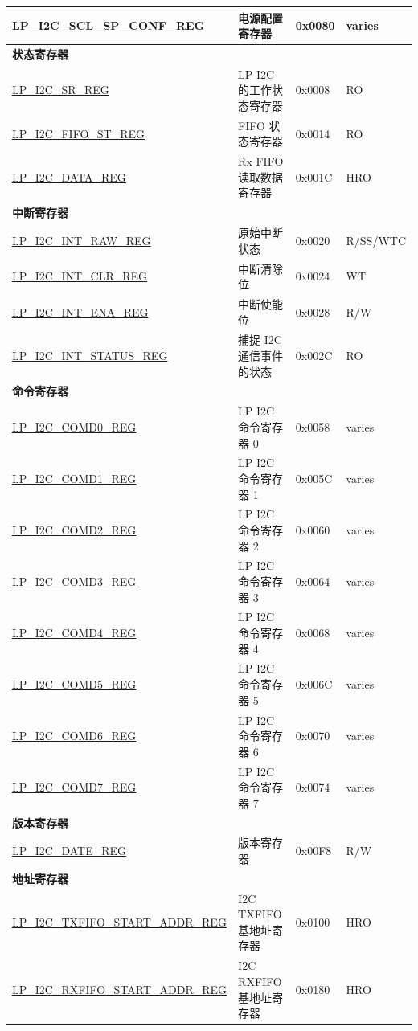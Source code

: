 \begin{longtable}{ | p{6.1cm} | p{7cm} | p{1.3cm} | p{1cm} | }
\hyperref[regdesc:LPI2CSCLSPCONFREG]{LP\_I2C\_SCL\_SP\_CONF\_REG} & 电源配置寄存器 & 0x0080 & varies \\ \hline
\multicolumn{4}{|l|}{\textbf{状态寄存器}} \\ \hline
\hyperref[regdesc:LPI2CSRREG]{LP\_I2C\_SR\_REG} & LP I2C 的工作状态寄存器 & 0x0008 & RO \\ \hline
\hyperref[regdesc:LPI2CFIFOSTREG]{LP\_I2C\_FIFO\_ST\_REG} & FIFO 状态寄存器 & 0x0014 & RO \\ \hline
\hyperref[regdesc:LPI2CDATAREG]{LP\_I2C\_DATA\_REG} & Rx FIFO 读取数据寄存器 & 0x001C & HRO \\ \hline
\multicolumn{4}{|l|}{\textbf{中断寄存器}} \\ \hline
\hyperref[regdesc:LPI2CINTRAWREG]{LP\_I2C\_INT\_RAW\_REG} & 原始中断状态 & 0x0020 & R/SS/WTC \\ \hline
\hyperref[regdesc:LPI2CINTCLRREG]{LP\_I2C\_INT\_CLR\_REG} & 中断清除位 & 0x0024 & WT \\ \hline
\hyperref[regdesc:LPI2CINTENAREG]{LP\_I2C\_INT\_ENA\_REG} & 中断使能位 & 0x0028 & R/W \\ \hline
\hyperref[regdesc:LPI2CINTSTATUSREG]{LP\_I2C\_INT\_STATUS\_REG} & 捕捉 I2C 通信事件的状态 & 0x002C & RO \\ \hline
\multicolumn{4}{|l|}{\textbf{命令寄存器}} \\ \hline
\hyperref[regdesc:LPI2CCOMD0REG]{LP\_I2C\_COMD0\_REG} & LP I2C 命令寄存器 0 & 0x0058 & varies \\ \hline
\hyperref[regdesc:LPI2CCOMD1REG]{LP\_I2C\_COMD1\_REG} & LP I2C 命令寄存器 1 & 0x005C & varies \\ \hline
\hyperref[regdesc:LPI2CCOMD2REG]{LP\_I2C\_COMD2\_REG} & LP I2C 命令寄存器 2 & 0x0060 & varies \\ \hline
\hyperref[regdesc:LPI2CCOMD3REG]{LP\_I2C\_COMD3\_REG} & LP I2C 命令寄存器 3 & 0x0064 & varies \\ \hline
\hyperref[regdesc:LPI2CCOMD4REG]{LP\_I2C\_COMD4\_REG} & LP I2C 命令寄存器 4 & 0x0068 & varies \\ \hline
\hyperref[regdesc:LPI2CCOMD5REG]{LP\_I2C\_COMD5\_REG} & LP I2C 命令寄存器 5 & 0x006C & varies \\ \hline
\hyperref[regdesc:LPI2CCOMD6REG]{LP\_I2C\_COMD6\_REG} & LP I2C 命令寄存器 6 & 0x0070 & varies \\ \hline
\hyperref[regdesc:LPI2CCOMD7REG]{LP\_I2C\_COMD7\_REG} & LP I2C 命令寄存器 7 & 0x0074 & varies \\ \hline
\multicolumn{4}{|l|}{\textbf{版本寄存器}} \\ \hline
\hyperref[regdesc:LPI2CDATEREG]{LP\_I2C\_DATE\_REG} & 版本寄存器 & 0x00F8 & R/W \\ \hline
\multicolumn{4}{|l|}{\textbf{地址寄存器}} \\ \hline
\hyperref[regdesc:LPI2CTXFIFOSTARTADDRREG]{LP\_I2C\_TXFIFO\_START\_ADDR\_REG} & I2C TXFIFO 基地址寄存器 & 0x0100 & HRO \\ \hline
\hyperref[regdesc:LPI2CRXFIFOSTARTADDRREG]{LP\_I2C\_RXFIFO\_START\_ADDR\_REG} & I2C RXFIFO 基地址寄存器 & 0x0180 & HRO \\ \hline
\end{longtable}
